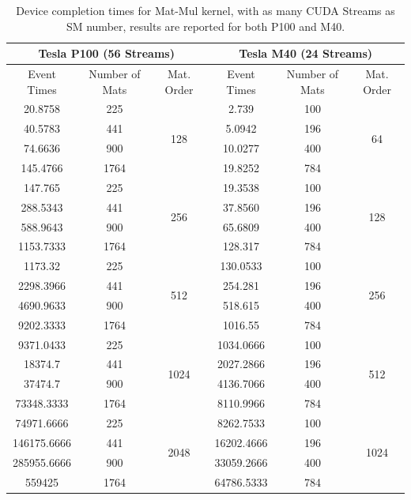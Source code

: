 \begin{table}	
	\centering
	\begin{tabular}{ | c c c  || c c c | } 
		\hline
		\multicolumn{3}{c}{\textbf{Tesla P100 (56 Streams)}} & \multicolumn{3}{c}{\textbf{Tesla M40 (24 Streams)}}\\ [0.5ex]
		\hline
		Event Times  & Number of Mats & Mat. Order & Event Times  & Number of Mats & Mat. Order  \\
		\hline \hline
		20.8758&	225&	\multirow{4}{*}{128}&	2.739&	100&	\multirow{4}{*}{64}\\
		40.5783&	441&	&	5.0942&	196&	\\
		74.6636&	900&	&	10.0277&	400& \\
		145.4766&	1764&	&	19.8252&	784&	\\
		\hline
		147.765&	225& \multirow{4}{*}{256}&	19.3538&	100&	\multirow{4}{*}{128}\\
		288.5343&	441&	&	37.8560&	196&	\\
		588.9643&	900&	&	65.6809&	400&	\\
		1153.7333&	1764&	&	128.317&	784&	\\
		\hline
		1173.32&	225&\multirow{4}{*}{512}&	130.0533&	100&	\multirow{4}{*}{256}\\
		2298.3966&	441&	&	254.281&	196&	\\
		4690.9633&	900&	&	518.615&	400&	\\
		9202.3333&	1764&	&	1016.55&	784&	\\
		\hline
		9371.0433&	225&	\multirow{4}{*}{1024}&	1034.0666&	100&	\multirow{4}{*}{512}\\
		18374.7&	441&	&	2027.2866&	196&	\\
		37474.7&	900&	&	4136.7066&	400&	\\
		73348.3333&	1764&	&	8110.9966&	784&	\\
		\hline
		74971.6666&	225&	\multirow{4}{*}{2048}&	8262.7533&	100&	\multirow{4}{*}{1024}\\
		146175.6666&	441&	&	16202.4666&	196&	\\
		285955.6666&	900&	&	33059.2666&	400&	\\
		559425&	1764&	&	64786.5333&	784&	\\
		\hline
	\end{tabular}
	\caption{Device completion times for Mat-Mul kernel, with as many CUDA Streams as SM number, results are reported for both P100 and M40.}	
	\label{tab:matvgsSM}		
\end{table}

